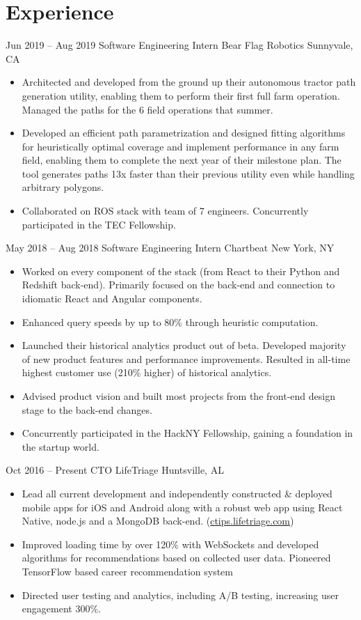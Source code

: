 \documentclass[letterpaper]{moderncv}        %
\begin{document}
\section{Experience}
\cventry
{Jun 2019 -- Aug 2019}
{Software Engineering Intern}
{Bear Flag Robotics}
{Sunnyvale, CA}
{}
{\begin{itemize}%
	\item Architected and developed from the ground up their autonomous tractor path generation utility, enabling them to perform their first full farm operation. Managed the paths for the 6 field operations that summer.
	\item Developed an efficient path parametrization and designed fitting algorithms for heuristically optimal coverage and implement performance in any farm field, enabling them to complete the next year of their milestone plan. The tool generates paths 13x faster than their previous utility even while handling arbitrary polygons.
	\item Collaborated on ROS stack with team of 7 engineers. Concurrently participated in the TEC Fellowship.
	\end{itemize}}
\cventry
{May 2018 -- Aug 2018}
{Software Engineering Intern}
{Chartbeat}
{New York, NY}
{}
{\begin{itemize}%
	\item Worked on every component of the stack (from React to their Python and Redshift back-end). Primarily focused on the back-end and connection to idiomatic React and Angular components.
	\item Enhanced query speeds by up to 80\% through heuristic computation.
	\item Launched their historical analytics product out of beta. Developed majority of new product features and performance improvements. Resulted in all-time highest customer use (210\% higher) of historical analytics.
	\item Advised product vision and built most projects from the front-end design stage to the back-end changes.
	\item Concurrently participated in the HackNY Fellowship, gaining a foundation in the startup world.
	\end{itemize}}
\cventry
{Oct 2016 -- Present}
{CTO}
{LifeTriage}
{Huntsville, AL}
{}
{\begin{itemize}%
	\item Lead all current development and independently constructed \& deployed mobile apps for iOS and Android along with a robust web app using React Native, node.js and a MongoDB back-end. (\href{https://ctips.lifetriage.com}{ctips.lifetriage.com})
	\item Improved loading time by over 120\% with WebSockets and developed algorithms for recommendations based on collected user data. Pioneered TensorFlow based career recommendation system
	\item Directed user testing and analytics, including A/B testing, increasing user engagement 300\%.
	\end{itemize}}
\end{document}
